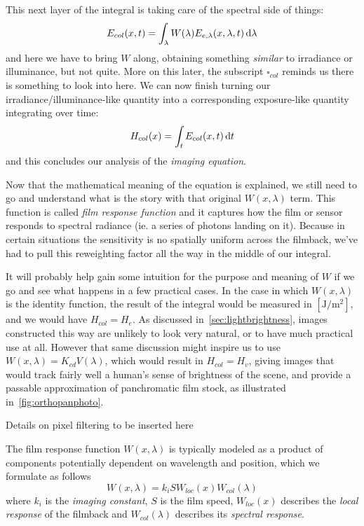 This next layer of the integral is taking care of the \gls{spectral} side of things:
\begin{displaymath}
	E_{col}(x, t) = \int_{\lambda} W(\lambda) E_{e,\lambda}(x,\lambda,t) \mathop{}\!\mathrm{d}\lambda
\end{displaymath}
and here we have to bring $W$ along, obtaining something \emph{similar} to \gls{irradiance} or
\gls{illuminance}, but not quite. More on this later, the subscript $\square_{col}$ reminds us 
there is something to look into here.
We can now finish turning our \gls{irradiance}/\gls{illuminance}-like quantity into 
a corresponding \gls{exposure}-like quantity integrating over time:
\begin{displaymath}
	H_{col}(x) = \int_t E_{col}(x,t) \mathop{}\!\mathrm{d} t
\end{displaymath}
and this concludes our analysis of the \textsl{imaging equation}.

Now that the mathematical meaning of the equation is explained, we still need to go
and understand what is the story with that original $W(x,\lambda)$ term. 
This function is called \textsl{\gls{film response function}} 
and it captures how the film or sensor responds to \gls{spectral} \gls{radiance}
(ie. a series of photons landing on it). Because in certain situations the
sensitivity is no spatially uniform across the filmback, we've had to pull
this reweighting factor all the way in the middle of our integral.

It will probably help gain some intuition for the purpose and meaning 
of $W$ if we go and see what happens in a few practical cases.
In the case in which $W(x, \lambda)$ is the identity function, the
result of the integral would be measured in $[\unit{\joule\per\square\meter}]$,
and we would have $H_{col} = H_e$. 
As discussed in~\cref{sec:lightbrightness}, images constructed this way are unlikely
to look very natural, or to have much practical use at all.
However that same discussion might inspire us to use $W(x,\lambda) = K_{cd} V(\lambda)$,
which would result in $H_{col} = H_v$, giving images that would track fairly well a human's
sense of brightness of the scene, and provide a passable approximation of
panchromatic film stock, as illustrated in~\cref{fig:orthopanphoto}.

\begin{inconstruction}
 Details on pixel filtering to be inserted here
\end{inconstruction}

The film response function $W(x, \lambda)$ is typically modeled as a product of
components potentially dependent on wavelength and position, which we formulate
as follows
\begin{equation}
W(x,\lambda) = k_i S W_{loc}(x) W_{col}(\lambda)
\end{equation}
where $k_i$ is the \textsl{imaging constant}, $S$ is the \gls{film speed},
$W_{loc}(x)$ describes the \textsl{local response} of the filmback and
$W_{col}(\lambda)$ describes its \textsl{spectral response}.

